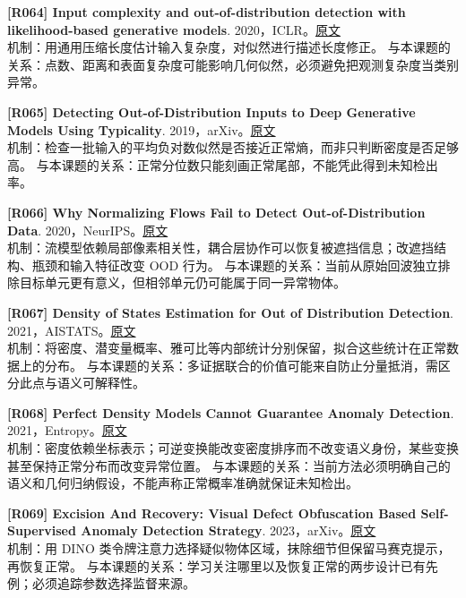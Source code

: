 \documentclass[11pt,a4paper]{article}
\begin{document}
\hypertarget{R064}{}\textbf{[R064] Input complexity and out-of-distribution detection with likelihood-based generative models}. 2020，ICLR。\href{https://arxiv.org/pdf/1909.11480}{原文}\\
机制：用通用压缩长度估计输入复杂度，对似然进行描述长度修正。 与本课题的关系：点数、距离和表面复杂度可能影响几何似然，必须避免把观测复杂度当类别异常。\par\medskip
\hypertarget{R065}{}\textbf{[R065] Detecting Out-of-Distribution Inputs to Deep Generative Models Using Typicality}. 2019，arXiv。\href{https://arxiv.org/pdf/1906.02994}{原文}\\
机制：检查一批输入的平均负对数似然是否接近正常熵，而非只判断密度是否足够高。 与本课题的关系：正常分位数只能刻画正常尾部，不能凭此得到未知检出率。\par\medskip
\hypertarget{R066}{}\textbf{[R066] Why Normalizing Flows Fail to Detect Out-of-Distribution Data}. 2020，NeurIPS。\href{https://arxiv.org/pdf/2006.08545}{原文}\\
机制：流模型依赖局部像素相关性，耦合层协作可以恢复被遮挡信息；改遮挡结构、瓶颈和输入特征改变 OOD 行为。 与本课题的关系：当前从原始回波独立排除目标单元更有意义，但相邻单元仍可能属于同一异常物体。\par\medskip
\hypertarget{R067}{}\textbf{[R067] Density of States Estimation for Out of Distribution Detection}. 2021，AISTATS。\href{https://proceedings.mlr.press/v130/morningstar21a/morningstar21a.pdf}{原文}\\
机制：将密度、潜变量概率、雅可比等内部统计分别保留，拟合这些统计在正常数据上的分布。 与本课题的关系：多证据联合的价值可能来自防止分量抵消，需区分此点与语义可解释性。\par\medskip
\hypertarget{R068}{}\textbf{[R068] Perfect Density Models Cannot Guarantee Anomaly Detection}. 2021，Entropy。\href{https://arxiv.org/pdf/2012.03808}{原文}\\
机制：密度依赖坐标表示；可逆变换能改变密度排序而不改变语义身份，某些变换甚至保持正常分布而改变异常位置。 与本课题的关系：当前方法必须明确自己的语义和几何归纳假设，不能声称正常概率准确就保证未知检出。\par\medskip
\hypertarget{R069}{}\textbf{[R069] Excision And Recovery: Visual Defect Obfuscation Based Self-Supervised Anomaly Detection Strategy}. 2023，arXiv。\href{https://arxiv.org/pdf/2310.04010}{原文}\\
机制：用 DINO 类令牌注意力选择疑似物体区域，抹除细节但保留马赛克提示，再恢复正常。 与本课题的关系：学习关注哪里以及恢复正常的两步设计已有先例；必须追踪参数选择监督来源。\par\medskip
\end{document}
